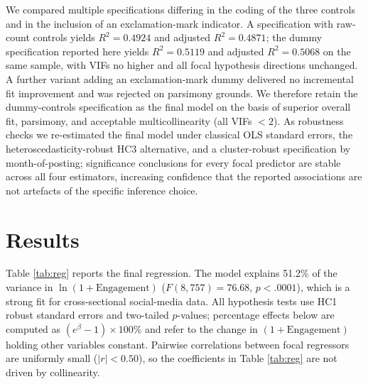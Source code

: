 \documentclass[12pt,a4paper]{article}
\begin{document}
We compared multiple specifications differing in the coding of the three controls and in the inclusion of an exclamation-mark indicator. A specification with raw-count controls yields $R^2 = 0.4924$ and adjusted $R^2 = 0.4871$; the dummy specification reported here yields $R^2 = 0.5119$ and adjusted $R^2 = 0.5068$ on the same sample, with VIFs no higher and all focal hypothesis directions unchanged. A further variant adding an exclamation-mark dummy delivered no incremental fit improvement and was rejected on parsimony grounds. We therefore retain the dummy-controls specification as the final model on the basis of superior overall fit, parsimony, and acceptable multicollinearity (all VIFs $<2$). As robustness checks we re-estimated the final model under classical OLS standard errors, the heteroscedasticity-robust HC3 alternative, and a cluster-robust specification by month-of-posting; significance conclusions for every focal predictor are stable across all four estimators, increasing confidence that the reported associations are not artefacts of the specific inference choice.

\section{Results}

Table \ref{tab:reg} reports the final regression. The model explains 51.2\% of the variance in $\ln(1+\text{Engagement})$ ($F(8,757)=76.68$, $p<.0001$), which is a strong fit for cross-sectional social-media data. All hypothesis tests use HC1 robust standard errors and two-tailed $p$-values; percentage effects below are computed as $(e^{\beta}-1)\times 100\%$ and refer to the change in $(1+\text{Engagement})$ holding other variables constant. Pairwise correlations between focal regressors are uniformly small ($|r|<0.50$), so the coefficients in Table \ref{tab:reg} are not driven by collinearity.
\end{document}
